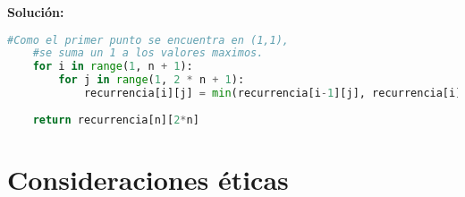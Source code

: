 \documentclass[11pt,letterpaper]{article}
\newenvironment{solution}{%
  \noindent\begin{shaded}
  \textbf{Solución:}\ }{
  \end{shaded}%
}
\begin{document}
\begin{enumerate}
\begin{solution}
\begin{lstlisting}[language=Python]
    #Como el primer punto se encuentra en (1,1),
    #se suma un 1 a los valores maximos.
    for i in range(1, n + 1):
        for j in range(1, 2 * n + 1):
            recurrencia[i][j] = min(recurrencia[i-1][j], recurrencia[i][j-1]) + c(i, j)
    
    return recurrencia[n][2*n]

    \end{lstlisting}
  \end{solution}
\end{enumerate}



\section*{Consideraciones éticas}
\end{document}
